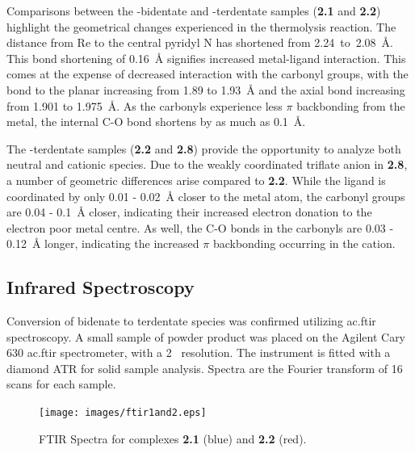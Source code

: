 Comparisons between the -bidentate and -terdentate samples (\textbf{2.1} and \textbf{2.2}) highlight the geometrical changes experienced in the thermolysis reaction. The distance from Re to the central pyridyl N has shortened from 2.24~to~2.08~\r{A}. This bond shortening of 0.16~\r{A} signifies increased metal-ligand interaction. This comes at the expense of decreased interaction with the carbonyl groups, with the bond to the planar  increasing from 1.89 to 1.93~\r{A} and the axial  bond increasing from 1.901 to 1.975~\r{A}. As the carbonyls experience less $\pi$ backbonding from the metal, the internal C-O bond shortens by as much as 0.1~\r{A}. 

The -terdentate samples (\textbf{2.2} and \textbf{2.8}) provide the opportunity to analyze both neutral and cationic species. Due to the weakly coordinated triflate anion in \textbf{2.8}, a number of geometric differences arise compared to \textbf{2.2}. While the ligand is coordinated by only 0.01 - 0.02~\r{A} closer to the metal atom, the carbonyl groups are 0.04 - 0.1~\r{A} closer, indicating their increased electron donation to the electron poor metal centre. As well, the C-O bonds in the carbonyls are 0.03 - 0.12~\r{A} longer, indicating the increased $\pi$ backbonding occurring in the cation.  





\FloatBarrier

\subsection{Infrared Spectroscopy}

Conversion of bidenate to terdentate species was confirmed utilizing \gls{ac.ftir} spectroscopy. A small sample of powder product was placed on the Agilent Cary 630 \gls{ac.ftir} spectrometer, with a 2~ resolution. The instrument is fitted with a diamond ATR for solid sample analysis. Spectra are the Fourier transform of 16 scans for each sample.

\begin{figure}[!htb]
 \begin{center}
  \texttt{[image: images/ftir1and2.eps]}
 \end{center}
\caption[FTIR Spectra for complexes \textbf{2.1} and \textbf{2.2}]{FTIR Spectra for complexes \textbf{2.1} (blue) and \textbf{2.2} (red).}
\label{fig.ir1}
\end{figure} 

